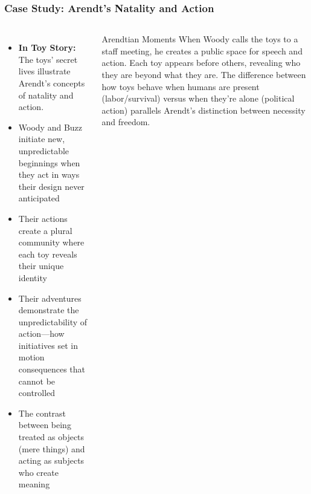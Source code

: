\documentclass{beamer}
\begin{document}
\begin{frame}
    \frametitle{Case Study: Arendt's Natality and Action}
    \begin{columns}
        \small
    \begin{itemize}
        \item \textbf{In Toy Story:} The toys' secret lives illustrate Arendt's concepts of natality and action.
        \item Woody and Buzz initiate new, unpredictable beginnings when they act in ways their design never anticipated
        \item Their actions create a plural community where each toy reveals their unique identity
        \item Their adventures demonstrate the unpredictability of action—how initiatives set in motion consequences that cannot be controlled
        \item The contrast between being treated as objects (mere things) and acting as subjects who create meaning
    \end{itemize}
    
    \begin{exampleblock}{Arendtian Moments}
    When Woody calls the toys to a staff meeting, he creates a public space for speech and action. Each toy appears before others, revealing who they are beyond what they are. The difference between how toys behave when humans are present (labor/survival) versus when they're alone (political action) parallels Arendt's distinction between necessity and freedom.
    \end{exampleblock}
    \end{columns}
    \end{frame}
\end{document}
